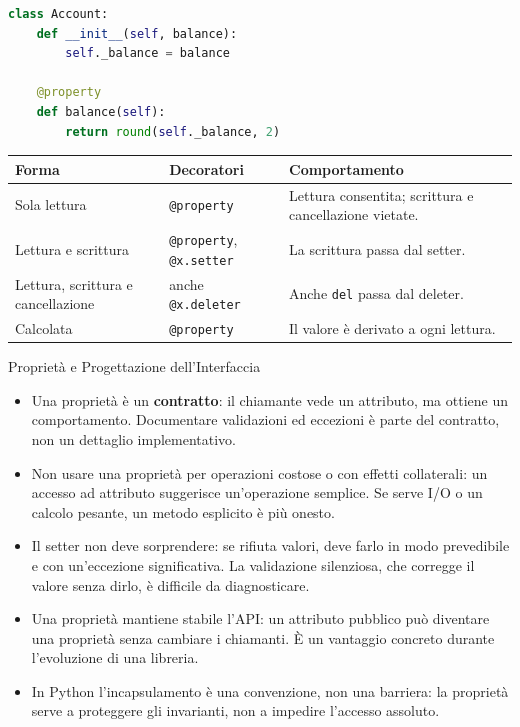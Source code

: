 \documentclass[12pt]{extarticle}
\begin{document}
\begin{lstlisting}[language=Python]
class Account:
    def __init__(self, balance):
        self._balance = balance

    @property
    def balance(self):
        return round(self._balance, 2)
\end{lstlisting}

\begin{center}
\small
\begin{tabular}{p{4.4cm}p{4.6cm}p{5.2cm}}
    \toprule
    \textbf{Forma} & \textbf{Decoratori} & \textbf{Comportamento} \\
    \midrule
    Sola lettura & \texttt{@property} & Lettura consentita; scrittura e cancellazione vietate. \\
    \addlinespace
    Lettura e scrittura & \texttt{@property}, \texttt{@x.setter} & La scrittura passa dal setter. \\
    \addlinespace
    Lettura, scrittura e cancellazione & anche \texttt{@x.deleter} & Anche \texttt{del} passa dal deleter. \\
    \addlinespace
    Calcolata & \texttt{@property} & Il valore è derivato a ogni lettura. \\
    \bottomrule
\end{tabular}
\end{center}

\begin{cbox}{Proprietà e Progettazione dell'Interfaccia}
\begin{itemize}
    \item Una proprietà è un \textbf{contratto}: il chiamante vede un attributo, ma ottiene un comportamento. Documentare validazioni ed eccezioni è parte del contratto, non un dettaglio implementativo.
    \item Non usare una proprietà per operazioni costose o con effetti collaterali: un accesso ad attributo suggerisce un'operazione semplice. Se serve I/O o un calcolo pesante, un metodo esplicito è più onesto.
    \item Il setter non deve sorprendere: se rifiuta valori, deve farlo in modo prevedibile e con un'eccezione significativa. La validazione silenziosa, che corregge il valore senza dirlo, è difficile da diagnosticare.
    \item Una proprietà mantiene stabile l'API: un attributo pubblico può diventare una proprietà senza cambiare i chiamanti. È un vantaggio concreto durante l'evoluzione di una libreria.
    \item In Python l'incapsulamento è una convenzione, non una barriera: la proprietà serve a proteggere gli invarianti, non a impedire l'accesso assoluto.
\end{itemize}
\end{cbox}
\end{document}
